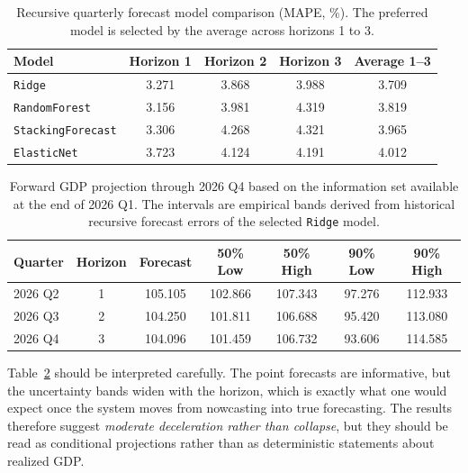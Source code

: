 \documentclass[12pt,a4paper]{article}
\begin{document}
\begin{table}[H]
    \centering
    \small
    \caption{Recursive quarterly forecast model comparison (MAPE, \%). The preferred model is selected by the average across horizons 1 to 3.}
    \label{tab:forward_model_scores}
    \begin{tabular}{lcccc}
        \hline
        Model & Horizon 1 & Horizon 2 & Horizon 3 & Average 1--3 \\
        \hline
        \texttt{Ridge} & 3.271 & 3.868 & 3.988 & 3.709 \\
        \texttt{RandomForest} & 3.156 & 3.981 & 4.319 & 3.819 \\
        \texttt{StackingForecast} & 3.306 & 4.268 & 4.321 & 3.965 \\
        \texttt{ElasticNet} & 3.723 & 4.124 & 4.191 & 4.012 \\
        \hline
    \end{tabular}
\end{table}

\begin{table}[H]
    \centering
    \small
    \caption{Forward GDP projection through 2026 Q4 based on the information set available at the end of 2026 Q1. The intervals are empirical bands derived from historical recursive forecast errors of the selected \texttt{Ridge} model.}
    \label{tab:forward_forecast_2026}
    \begin{tabular}{lcccccc}
        \toprule
        Quarter & Horizon & Forecast & 50\% Low & 50\% High & 90\% Low & 90\% High \\
        \midrule
        2026 Q2 & 1 & 105.105 & 102.866 & 107.343 & 97.276 & 112.933 \\
        2026 Q3 & 2 & 104.250 & 101.811 & 106.688 & 95.420 & 113.080 \\
        2026 Q4 & 3 & 104.096 & 101.459 & 106.732 & 93.606 & 114.585 \\
        \bottomrule
    \end{tabular}
\end{table}

Table~\ref{tab:forward_forecast_2026} should be interpreted carefully. The point forecasts are informative, but the uncertainty bands widen with the horizon, which is exactly what one would expect once the system moves from nowcasting into true forecasting. The results therefore suggest \textit{moderate deceleration rather than collapse}, but they should be read as conditional projections rather than as deterministic statements about realized GDP.
\end{document}
